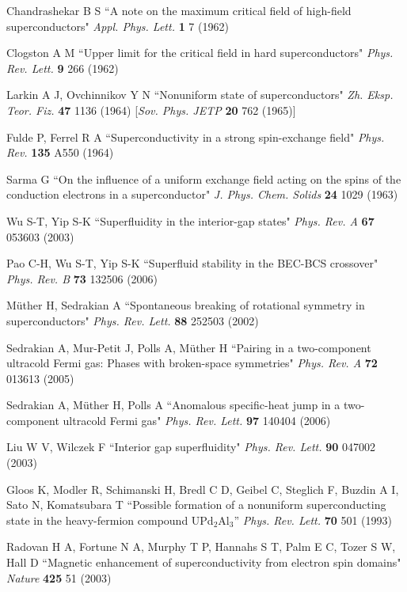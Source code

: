 \documentclass[pra,letterpaper,twocolumn,showpacs,superscriptaddress]{revtex4}
\begin{document}
\begin{thebibliography}{300}
 Chandrashekar B S ``A note on the maximum critical field of high-field superconductors"
{\it Appl. Phys. Lett.} \textbf{1} 7 (1962)

 Clogston A M ``Upper limit for the critical field in hard superconductors" {\it Phys. Rev. Lett.} \textbf{9} 266 (1962)

 Larkin A J, Ovchinnikov Y N ``Nonuniform state of superconductors"
{\it Zh. Eksp. Teor. Fiz.} \textbf{47} 1136 (1964) [{\it Sov. Phys. JETP} \textbf{20} 762 (1965)]

 Fulde P, Ferrel R A ``Superconductivity in a strong spin-exchange field" {\it Phys. Rev.} \textbf{135} A550 (1964)

 Sarma G ``On the influence of a uniform exchange field acting on the spins of the conduction electrons in a superconductor"
{\it J. Phys. Chem. Solids} \textbf{24} 1029 (1963)

 Wu S-T, Yip S-K ``Superfluidity in the interior-gap states" {\it Phys. Rev. A} \textbf{67} 053603 (2003)

 Pao C-H, Wu S-T, Yip S-K ``Superfluid stability in the BEC-BCS crossover" {\it Phys. Rev. B} \textbf{73} 132506 (2006)

 M\"uther H, Sedrakian A ``Spontaneous breaking of rotational symmetry in superconductors"
{\it Phys. Rev. Lett.} \textbf{88} 252503 (2002)

 Sedrakian A, Mur-Petit J, Polls A, M\"uther H ``Pairing in a two-component ultracold Fermi gas: Phases with broken-space symmetries"
{\it Phys. Rev. A} \textbf{72} 013613 (2005)

 Sedrakian A, M\"uther H, Polls A ``Anomalous specific-heat jump in a two-component ultracold Fermi gas"
{\it Phys. Rev. Lett.} \textbf{97} 140404 (2006)

 Liu W V, Wilczek F ``Interior gap superfluidity"  {\it Phys. Rev. Lett.} \textbf{90} 047002 (2003)

 Gloos K, Modler R, Schimanski H, Bredl C D, Geibel C, Steglich F, Buzdin A I, Sato N, Komatsubara T
``Possible formation of a nonuniform superconducting state in the heavy-fermion compound UPd${}_2$Al${}_3$''
{\it Phys. Rev. Lett.} \textbf{70} 501 (1993)

 Radovan H A, Fortune N A, Murphy T P, Hannahs S T, Palm E C, Tozer S W, Hall D 
``Magnetic enhancement of superconductivity from electron spin domains"
{\it Nature} \textbf{425} 51 (2003)


\end{thebibliography}
\end{document}
